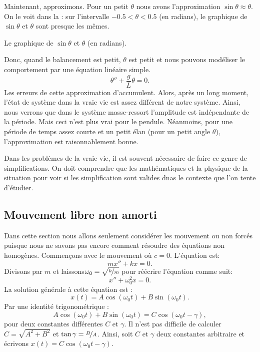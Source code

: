 Maintenant, approximons. Pour un petit $\theta$ nous avons l'approximation 
$\sin \theta \approx \theta$.  On le voit dans la :  sur l'intervalle 
$-0.5 < \theta < 0.5$ (en radians), le graphique de  $\sin \theta$ et $\theta$ sont presque les mêmes.

\begin{mywrapfig}{3.25in}
\capstart {}
\caption{Le graphique de  $\sin \theta$ et $\theta$ (en radians).\label{mv:sinthetafig}}
\end{mywrapfig}

Donc, quand le balancement est petit,  $\theta$ est petit et nous pouvons modéliser le comportement par une équation linéaire simple.  
\begin{equation*}
	\theta'' + \frac{g}{L} \theta = 0 .
\end{equation*}
Les erreurs de cette approximation d'accumulent. Alors, après un long moment, l'état de système dans la vraie vie est assez différent de notre système. Ainsi, nous verrons que dans le système masse-ressort l'amplitude est indépendante de la période. 
Mais ceci n'est plus vrai pour le pendule.  Néanmoins, pour une période de temps assez courte et un petit élan (pour un petit angle $\theta$), l'approximation est raisonnablement bonne. 

Dans les problèmes de la vraie vie, il est souvent nécessaire de faire ce genre de simplifications.  On doit comprendre que les mathématiques et la physique de la situation pour voir si les simplification sont valides dnas le contexte que l'on tente d'étudier. 





\subsection{Mouvement libre non amorti}

Dans cette section nous allons seulement considérer les mouvement ou non forcés puisque nous ne savons pas encore comment résoudre des équations non homogènes. Commençons avec le mouvement
 où $c=0$.  L'équation est: 
\begin{equation*}
	mx'' + kx = 0 .
\end{equation*}
Divisons par $m$ et laissons$\omega_0 = \sqrt{\nicefrac{k}{m}}$ pour réécrire l'équation comme suit: 
\begin{equation*}
	x'' + \omega_0^2 x = 0 .
\end{equation*}
La solution générale à cette équation est : 
\begin{equation*}
	x(t) = A \cos (\omega_0 t) + B \sin (\omega_0 t) .
\end{equation*}
Par une identité trigonométrique : 
\begin{equation*}
	A \cos (\omega_0 t) + B \sin (\omega_0 t) =
	C \cos ( \omega_0 t - \gamma ) ,
\end{equation*}
pour deux constantes différentes $C$ et $\gamma$.
Il n'est pas difficile de calculer 
$C= \sqrt{A^2 + B^2}$ et $\tan \gamma = \nicefrac{B}{A}$.  
Ainsi, soit $C$ et $\gamma$ deux constantes arbitraire et écrivons 
$x(t) = C \cos ( \omega_0 t - \gamma )$.

